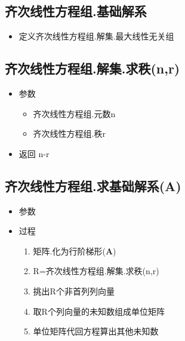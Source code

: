 \documentclass[UTF8,a4paper,12pt,scheme=chinese]{ctexbook}
\begin{document}
	\subsection{齐次线性方程组.基础解系}
	\begin{itemize}
		\item 定义\quad 齐次线性方程组.解集.最大线性无关组
	\end{itemize}
	\subsection{齐次线性方程组.解集.求秩(n,r)}
	\begin{itemize}
		\item 参数
		\begin{itemize}
			\item 齐次线性方程组.元数n
			\item 齐次线性方程组.秩r
		\end{itemize}
		\item 返回
		\subitem n-r
	\end{itemize}
	\subsection{齐次线性方程组.求基础解系(A)}
	\begin{itemize}
		\item 参数
		\item 过程
		\begin{enumerate}
			\item 矩阵.化为行阶梯形($ \boldsymbol{A} $)
			\item R=齐次线性方程组.解集.求秩(n,r)
			\item 挑出R个非首列列向量
			\item 取R个列向量的未知数组成单位矩阵
			\item 单位矩阵代回方程算出其他未知数
		\end{enumerate}
	\end{itemize}
\end{document}
